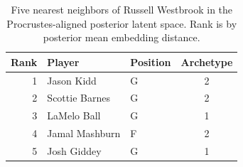 \begin{table}[htbp]
  \centering\small
  \begin{tabular}{rllc}
    \toprule
    Rank & Player & Position & Archetype \\
    \midrule
    1 & Jason Kidd & G & 2 \\
    2 & Scottie Barnes & G & 2 \\
    3 & LaMelo Ball & G & 1 \\
    4 & Jamal Mashburn & F & 2 \\
    5 & Josh Giddey & G & 1 \\
    \bottomrule
  \end{tabular}
  \caption{Five nearest neighbors of Russell Westbrook in the Procrustes-aligned posterior latent space. Rank is by posterior mean embedding distance.}
  \label{tab:Russell_Westbrook_neighbors}
\end{table}


